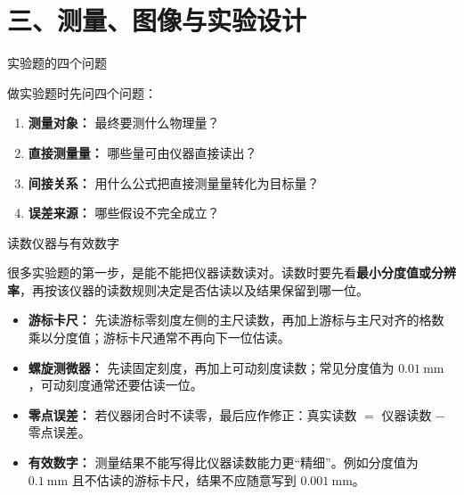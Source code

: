 \section*{三、测量、图像与实验设计}

\begin{conceptbox}{实验题的四个问题}

做实验题时先问四个问题：
\begin{enumerate}
  \item \textbf{测量对象：} 最终要测什么物理量？
  \item \textbf{直接测量量：} 哪些量可由仪器直接读出？
  \item \textbf{间接关系：} 用什么公式把直接测量量转化为目标量？
  \item \textbf{误差来源：} 哪些假设不完全成立？
\end{enumerate}

\begin{center}


\label{fig:experiment-error-flow}
\end{center}
\end{conceptbox}

\begin{conceptbox}{读数仪器与有效数字}

很多实验题的第一步，是能不能把仪器读数读对。读数时要先看\textbf{最小分度值或分辨率}，再按该仪器的读数规则决定是否估读以及结果保留到哪一位。

\begin{center}


\label{fig:vernier-micrometer-reading}
\end{center}

\begin{itemize}
  \item \textbf{游标卡尺：} 先读游标零刻度左侧的主尺读数，再加上游标与主尺对齐的格数乘以分度值；游标卡尺通常不再向下一位估读。
  \item \textbf{螺旋测微器：} 先读固定刻度，再加上可动刻度读数；常见分度值为 $0.01\ \mathrm{mm}$，可动刻度通常还要估读一位。
  \item \textbf{零点误差：} 若仪器闭合时不读零，最后应作修正：真实读数 $=$ 仪器读数 $-$ 零点误差。
  \item \textbf{有效数字：} 测量结果不能写得比仪器读数能力更“精细”。例如分度值为 $0.1\ \mathrm{mm}$ 且不估读的游标卡尺，结果不应随意写到 $0.001\ \mathrm{mm}$。
\end{itemize}
\end{conceptbox}

